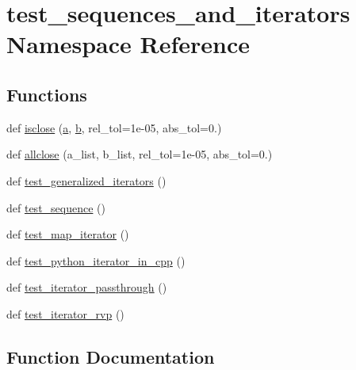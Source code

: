 \hypertarget{namespacetest__sequences__and__iterators}{}\section{test\+\_\+sequences\+\_\+and\+\_\+iterators Namespace Reference}
\label{namespacetest__sequences__and__iterators}
\subsection*{Functions}
\begin{DoxyCompactItemize}
\item 
def \mbox{\hyperlink{namespacetest__sequences__and__iterators_ad1bef1ddb9a84273aa9421241f77a1b8}{isclose}} (\mbox{\hyperlink{_s_d_l__opengl__glext_8h_a3309789fc188587d666cda5ece79cf82}{a}}, \mbox{\hyperlink{_s_d_l__opengl__glext_8h_a0f71581a41fd2264c8944126dabbd010}{b}}, rel\+\_\+tol=1e-\/05, abs\+\_\+tol=0.)
\item 
def \mbox{\hyperlink{namespacetest__sequences__and__iterators_ad8b2b4c688f3d2d8e18bc1a305118260}{allclose}} (a\+\_\+list, b\+\_\+list, rel\+\_\+tol=1e-\/05, abs\+\_\+tol=0.)
\item 
def \mbox{\hyperlink{namespacetest__sequences__and__iterators_a8fdeb86fc58d12a2bf80a0841f2c31b4}{test\+\_\+generalized\+\_\+iterators}} ()
\item 
def \mbox{\hyperlink{namespacetest__sequences__and__iterators_a1a2ad7bc1b9f0c61ac0cb0c95625943f}{test\+\_\+sequence}} ()
\item 
def \mbox{\hyperlink{namespacetest__sequences__and__iterators_ab7135ce6fc3eaaf6a20f8be7c152ef06}{test\+\_\+map\+\_\+iterator}} ()
\item 
def \mbox{\hyperlink{namespacetest__sequences__and__iterators_a5ed4b9ec57576988cd48e5f83673b905}{test\+\_\+python\+\_\+iterator\+\_\+in\+\_\+cpp}} ()
\item 
def \mbox{\hyperlink{namespacetest__sequences__and__iterators_abe4cb20df81d1d46aedc9e2b668c9b99}{test\+\_\+iterator\+\_\+passthrough}} ()
\item 
def \mbox{\hyperlink{namespacetest__sequences__and__iterators_ae4564b694d6acfba18f5ce8ad66e3eba}{test\+\_\+iterator\+\_\+rvp}} ()
\end{DoxyCompactItemize}


\subsection{Function Documentation}
\mbox{\label{namespacetest__sequences__and__iterators_ad8b2b4c688f3d2d8e18bc1a305118260}} 
